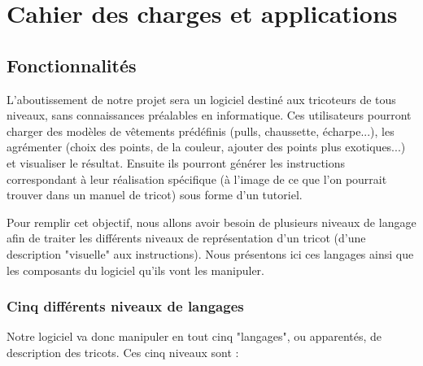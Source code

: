 \documentclass{article}
\begin{document}
\section{Cahier des charges et applications}

\subsection{Fonctionnalités}

L'aboutissement de notre projet sera un logiciel destiné aux tricoteurs de tous niveaux, sans connaissances préalables en informatique.
Ces utilisateurs pourront charger des modèles de vêtements prédéfinis (pulls, chaussette, écharpe...), les agrémenter (choix des points,
de la couleur, ajouter des points plus exotiques...) et visualiser le résultat. Ensuite ils pourront générer les instructions correspondant à leur réalisation
spécifique (à l'image de ce que l'on pourrait trouver dans un manuel de tricot) sous forme d'un tutoriel.

Pour remplir cet objectif, nous allons avoir besoin de plusieurs niveaux de langage afin de traiter les différents niveaux de
représentation d'un tricot (d'une description "visuelle" aux instructions). Nous présentons ici ces langages ainsi que les composants du
logiciel qu'ils vont les manipuler.

\subsubsection{Cinq différents niveaux de langages}

Notre logiciel va donc manipuler en tout cinq "langages", ou apparentés, de description des tricots. Ces cinq niveaux sont :
\end{document}
